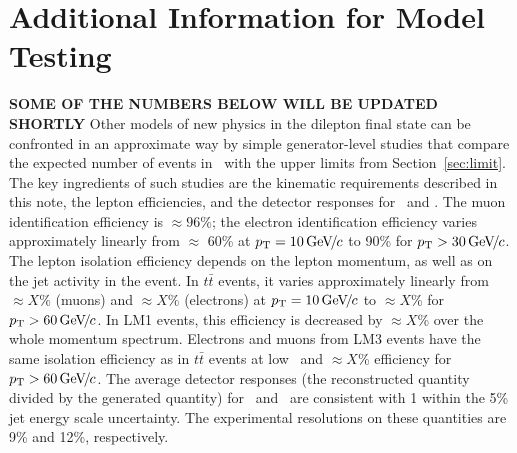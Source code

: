 \section{Additional Information for Model Testing}
\label{sec:outreach}
{\bf SOME OF THE NUMBERS BELOW WILL BE UPDATED SHORTLY}
Other models of new physics in the dilepton final state can be confronted in an approximate way by simple 
generator-level studies that compare the expected number of events in \lumifinal\
with the upper limits from Section~\ref{sec:limit}.
The key ingredients of such studies are the kinematic requirements described 
in this note, the lepton efficiencies, and the detector responses for \HT\ and \MET.
%
The muon identification efficiency is $\approx 96\%$;
the electron identification efficiency varies approximately linearly from $\approx$ 60\% at 
$p_{\mathrm{T}} = 10{\,\text{Ge\hspace{-.08em}V\hspace{-0.16em}/\hspace{-0.08em}}c}$ to 90\% for $p_{\mathrm{T}} > 30{\,\text{Ge\hspace{-.08em}V\hspace{-0.16em}/\hspace{-0.08em}}c}$.  
%
The lepton isolation efficiency depends on the lepton momentum, as well as on the jet activity in the 
event.
In $t\bar{t}$ events, it varies approximately linearly from $\approx X\%$ (muons)
and $\approx X\%$ (electrons) at $p_{\mathrm{T}}=10{\,\text{Ge\hspace{-.08em}V\hspace{-0.16em}/\hspace{-0.08em}}c}$ to $\approx X\%$ for $p_{\mathrm{T}}>60{\,\text{Ge\hspace{-.08em}V\hspace{-0.16em}/\hspace{-0.08em}}c}$. 
In LM1 events, this efficiency is decreased by $\approx X$\% over the whole momentum spectrum.
Electrons and muons from LM3 events have the same isolation efficiency as in $t\bar{t}$ events
at low \pt\ and $\approx X$\% efficiency for $p_{\mathrm{T}}>60{\,\text{Ge\hspace{-.08em}V\hspace{-0.16em}/\hspace{-0.08em}}c}$.  
%
The average detector responses (the reconstructed quantity divided by the generated quantity) 
for \HT\ and \MET\ are consistent with 1 within the 5\% jet energy scale uncertainty.
The experimental resolutions on these quantities are 9\% and 12\%, respectively.



